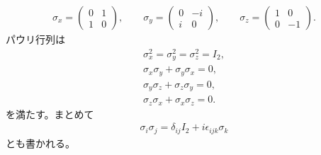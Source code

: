 \documentclass[10pt,a4paper]{jarticle}
\begin{document}
\begin{align}
\sigma_x = \left(\begin{array}{cc}
0 & 1 \\
1 & 0 
\end{array}\right), \qquad
%
\sigma_y = \left(\begin{array}{cc}
0 & -i \\
i & 0 
\end{array}\right), \qquad
%
\sigma_z = \left(\begin{array}{cc}
1 & 0 \\
0 & -1 
\end{array}\right).
\end{align}
%
パウリ行列は
\begin{align}
\sigma_x^2 = \sigma_y^2 = \sigma_z^2 = I_2, \\
\sigma_x \sigma_y + \sigma_y \sigma_x = 0, \\
\sigma_y \sigma_z + \sigma_z \sigma_y = 0, \\
\sigma_z \sigma_x + \sigma_x \sigma_z = 0.
\end{align}
を満たす。まとめて
\begin{align}
\sigma_i \sigma_j = \delta_{ij} I_2 + i\epsilon_{ijk} \sigma_k
\end{align}
とも書かれる。
\end{document}
